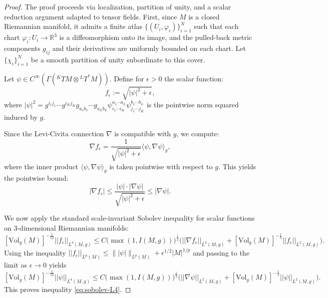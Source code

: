 \documentclass{amsart}
\begin{document}
\begin{proof}
The proof proceeds via localization, partition of unity, and a scalar reduction argument adapted to tensor fields. First, since $M$ is a closed Riemannian manifold, it admits a finite atlas $\{(U_i, \varphi_i)\}_{i=1}^N$ such that each chart $\varphi_i : U_i \to \mathbb{R}^3$ is a diffeomorphism onto its image, and the pulled-back metric components $g_{ij}$ and their derivatives are uniformly bounded on each chart. Let $\{\chi_i\}_{i=1}^N$ be a smooth partition of unity subordinate to this cover.

\noindent Let $\psi \in C^\infty(\Gamma({}^{K}TM \otimes {}^{L}T^*M))$. Define for $\epsilon > 0$ the scalar function:
\[
f_\epsilon := \sqrt{|\psi|^2 + \epsilon},
\]
where $|\psi|^2 = g^{i_1 j_1} \cdots g^{i_K j_K} g_{a_1 b_1} \cdots g_{a_L b_L} \psi_{i_1 \cdots i_K}^{a_1 \cdots a_L} \psi_{j_1 \cdots j_K}^{b_1 \cdots b_L}$ is the pointwise norm squared induced by $g$.

\noindent Since the Levi-Civita connection $\nabla$ is compatible with $g$, we compute:
\[
\nabla f_\epsilon = \frac{1}{\sqrt{|\psi|^2 + \epsilon}} \langle \psi, \nabla \psi \rangle_g,
\]
where the inner product $\langle \psi, \nabla \psi \rangle_g$ is taken pointwise with respect to $g$. This yields the pointwise bound:
\[
|\nabla f_\epsilon| \leq \frac{|\psi| \cdot |\nabla \psi|}{\sqrt{|\psi|^2 + \epsilon}} \leq |\nabla \psi|.
\]

\noindent We now apply the standard scale-invariant Sobolev inequality for scalar functions on 3-dimensional Riemannian manifolds:
\[
[\text{Vol}_{g}(M)]^{-\frac{1}{12}}||f_{\epsilon}||_{L^{4}(M,g)}\leq C\bigg(\max(1,I(M,g))\bigg)^{\frac{1}{2}}\bigg(||\nabla f_{\epsilon}||_{L^{2}(M,g)}+[\text{Vol}_{g}(M)]^{-\frac{1}{3}}||f_{\epsilon}||_{L^{2}(M,g)}\bigg).
\]
Using the inequality $||f_\epsilon||_{L^p(M)} \leq \||\psi|\|_{L^p(M)} + \epsilon^{1/2}|M|^{1/p}$ and passing to the limit as $\epsilon \to 0$ yields
\[
[\text{Vol}_{g}(M)]^{-\frac{1}{12}}||\psi||_{L^{4}(M,g)}\leq C\bigg(\max(1,I(M,g))\bigg)^{\frac{1}{2}}\bigg(||\nabla\psi||_{L^{2}(M,g)}+[\text{Vol}_{g}(M)]^{-\frac{1}{3}}||\psi||_{L^{2}(M,g)}\bigg).
\]
This proves inequality \eqref{eq:sobolev-L4}.


\end{proof}
\end{document}
